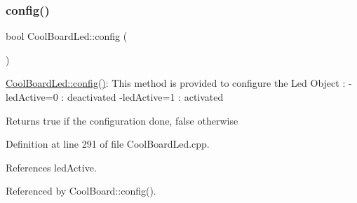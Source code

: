 \subsubsection{\texorpdfstring{config()}{config()}}
{\footnotesize\ttfamily bool Cool\+Board\+Led\+::config (\begin{DoxyParamCaption}{ }\end{DoxyParamCaption})}

\hyperlink{classCoolBoardLed_a1b60e5e30bea96c49ed62ed1bf1ffc8b}{Cool\+Board\+Led\+::config()}\+: This method is provided to configure the Led Object \+: -\/led\+Active=0 \+: deactivated -\/led\+Active=1 \+: activated \begin{DoxyReturn}{Returns}
true if the configuration done, false otherwise 
\end{DoxyReturn}


Definition at line 291 of file Cool\+Board\+Led.\+cpp.



References led\+Active.



Referenced by Cool\+Board\+::config().


